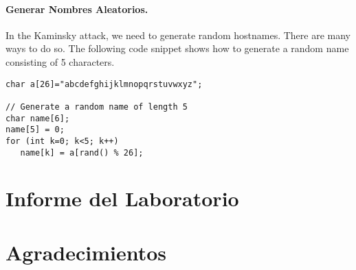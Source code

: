 \paragraph{Generar Nombres Aleatorios.} In the Kaminsky attack, we need to 
generate random hostnames. There are many ways to do so. The following 
code snippet shows how to generate a random name consisting of 
5 characters. 

\begin{lstlisting}
char a[26]="abcdefghijklmnopqrstuvwxyz";

// Generate a random name of length 5
char name[6];
name[5] = 0;
for (int k=0; k<5; k++)  
   name[k] = a[rand() % 26];
\end{lstlisting}
 



\section{Informe del Laboratorio}




\section*{Agradecimientos}




\thispagestyle{empty}

\def\baselinestretch{1}









